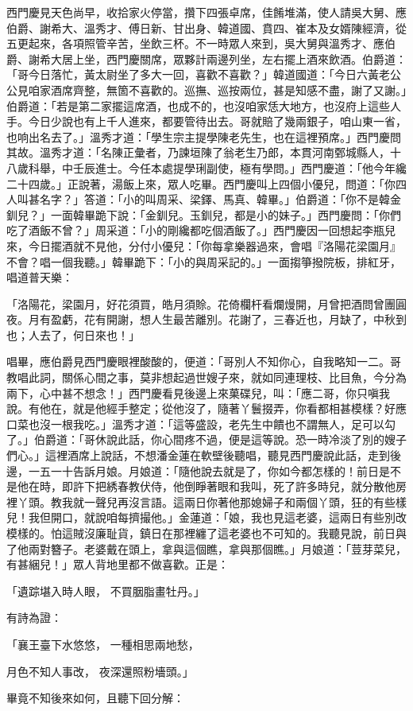 \begin{showcontents}{}
西門慶見天色尚早，收拾家火停當，攢下四張卓席，佳餚堆滿，使人請吳大舅、應伯爵、謝希大、溫秀才、傅日新、甘出身、韓道國、賁四、崔本及女婿陳經濟，從五更起來，各項照管辛苦，坐飲三杯。不一時眾人來到，吳大舅與溫秀才、應伯爵、謝希大居上坐，西門慶關席，眾夥計兩邊列坐，左右擺上酒來飲酒。伯爵道：「哥今日落忙，黃太尉坐了多大一回，喜歡不喜歡？」韓道國道：「今日六黃老公公見咱家酒席齊整，無箇不喜歡的。巡撫、巡按兩位，甚是知感不盡，謝了又謝。」伯爵道：「若是第二家擺這席酒，也成不的，也沒咱家恁大地方，也沒府上這些人手。今日少說也有上千人進來，都要管待出去。哥就賠了幾兩銀子，咱山東一省，也响出名去了。」溫秀才道：「學生宗主提學陳老先生，也在這裡預席。」西門慶問其故。溫秀才道：「名陳正彙者，乃諫垣陳了翁老生乃郎，本貫河南鄄城縣人，十八歲科舉，中壬辰進士。今任本處提學琍副使，極有學問。」西門慶道：「他今年纔二十四歲。」正說著，湯飯上來，眾人吃畢。西門慶叫上四個小優兒，問道：「你四人叫甚名字？」答道：「小的叫周采、梁鐸、馬真、韓畢。」伯爵道：「你不是韓金釧兒？」一面韓畢跪下說：「金釧兒。玉釧兒，都是小的妹子。」西門慶問：「你們吃了酒飯不曾？」周采道：「小的剛纔都吃個酒飯了。」西門慶因一回想起李瓶兒來，今日擺酒就不見他，分付小優兒：「你每拿樂器過來，會唱『洛陽花梁園月』不會？唱一個我聽。」韓畢跪下：「小的與周采記的。」一面搊箏撥院板，排紅牙，唱道普天樂：

「洛陽花，梁園月，好花須買，皓月須賒。花倚欄杆看爛熳開，月曾把酒問曾團圓夜。月有盈虧，花有開謝，想人生最苦離別。花謝了，三春近也，月缺了，中秋到也；人去了，何日來也！」

唱畢，應伯爵見西門慶眼裡酸酸的，便道：「哥別人不知你心，自我略知一二。哥教唱此詞，關係心間之事，莫非想起過世嫂子來，就如同連理枝、比目魚，今分為兩下，心中甚不想念！」西門慶看見後邊上來菓碟兒，叫：「應二哥，你只嗔我說。有他在，就是他經手整定；從他沒了，隨著丫鬟掇弄，你看都相甚模樣？好應口菜也沒一根我吃。」溫秀才道：「這等盛設，老先生中饋也不謂無人，足可以勾了。」伯爵道：「哥休說此話，你心間疼不過，便是這等說。恐一時冷淡了別的嫂子們心。」這裡酒席上說話，不想潘金蓮在軟壁後聽唱，聽見西門慶說此話，走到後邊，一五一十告訴月娘。月娘道：「隨他說去就是了，你如今都怎樣的！前日是不是他在時，即許下把綉春教伏侍，他倒睜著眼和我叫，死了許多時兒，就分散他房裡丫頭。教我就一聲兒再沒言語。這兩日你著他那媳婦子和兩個丫頭，狂的有些樣兒！我但開口，就說咱每擠撮他。」金蓮道：「娘，我也見這老婆，這兩日有些別改模樣的。怕這賊沒廉耻貨，鎮日在那裡纏了這老婆也不可知的。我聽見說，前日與了他兩對簪子。老婆戴在頭上，拿與這個瞧，拿與那個瞧。」月娘道：「荳芽菜兒，有甚綑兒！」眾人背地里都不做喜歡。正是：

「遺踪堪入時人眼，  不買胭脂畫牡丹。」

有詩為證：

「襄王臺下水悠悠，  一種相思兩地愁，

月色不知人事改，  夜深還照粉墻頭。」

畢竟不知後來如何，且聽下回分解：




\end{showcontents}


